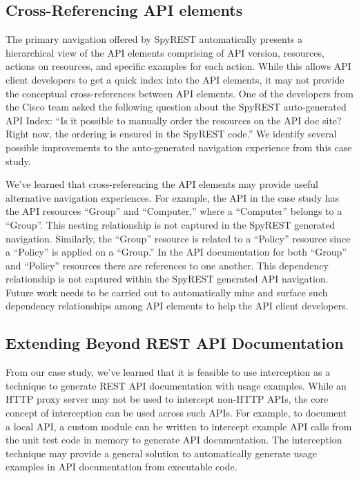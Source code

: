 \documentclass[10pt, conference]{IEEEtran}
\begin{document}
\subsection{Cross-Referencing API elements}
The primary navigation offered by SpyREST automatically presents a hierarchical view of the API elements comprising of API version, resources, actions on resources, and specific examples for each action. While this allows API client developers to get a quick index into the API elements, it may not provide the conceptual cross-references between API elements. One of the developers from the Cisco team asked the following question about the SpyREST auto-generated API Index: ``Is it possible to manually order the resources on the API doc site? Right now, the ordering is ensured in the SpyREST code.'' We identify several possible improvements to the auto-generated navigation experience from this case study.

We've learned that cross-referencing the API elements may provide useful alternative navigation experiences. For example, the API in the case study has the API resources ``Group'' and ``Computer,'' where a ``Computer'' belongs to a ``Group''. This nesting relationship is not captured in the SpyREST generated navigation. Similarly, the ``Group'' resource is related to a ``Policy'' resource since a ``Policy'' is applied on a ``Group.'' In the API documentation for both ``Group'' and ``Policy'' resources there are references to one another. This dependency relationship is not captured within the SpyREST generated API navigation. Future work needs to be carried out to automatically mine and surface such dependency relationships among API elements to help the API client developers.


\subsection{Extending Beyond REST API Documentation}
From our case study, we've learned that it is feasible to use interception as a technique to generate REST API documentation with usage examples. While an HTTP proxy server may not be used to intercept non-HTTP APIs, the core concept of interception can be used across such APIs. For example, to document a local API, a custom module can be written to intercept example API calls from the unit test code in memory to generate API documentation. The interception technique may provide a general solution to automatically generate usage examples in API documentation from executable code.
\end{document}
